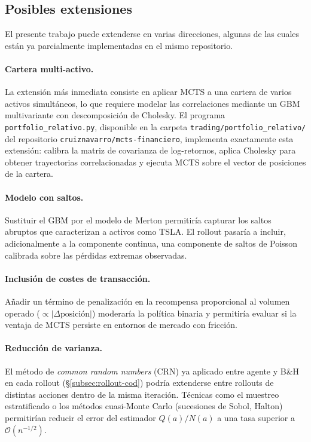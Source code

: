 \subsection{Posibles extensiones}
\label{subsec:extensiones}

El presente trabajo puede extenderse en varias direcciones, algunas de las cuales están ya parcialmente implementadas en el mismo repositorio.

\paragraph{Cartera multi-activo.} La extensión más inmediata consiste en aplicar MCTS a una cartera de varios activos simultáneos, lo que requiere modelar las correlaciones mediante un GBM multivariante con descomposición de Cholesky. El programa \texttt{portfolio\_relativo.py}, disponible en la carpeta \texttt{trading/portfolio\_relativo/} del repositorio \texttt{cruiznavarro/mcts-financiero}, implementa exactamente esta extensión: calibra la matriz de covarianza de log-retornos, aplica Cholesky para obtener trayectorias correlacionadas y ejecuta MCTS sobre el vector de posiciones de la cartera.

\paragraph{Modelo con saltos.} Sustituir el GBM por el modelo de Merton permitiría capturar los saltos abruptos que caracterizan a activos como TSLA. El rollout pasaría a incluir, adicionalmente a la componente continua, una componente de saltos de Poisson calibrada sobre las pérdidas extremas observadas.

\paragraph{Inclusión de costes de transacción.} Añadir un término de penalización en la recompensa proporcional al volumen operado ($\propto |\Delta\text{posición}|$) moderaría la política binaria y permitiría evaluar si la ventaja de MCTS persiste en entornos de mercado con fricción.

\paragraph{Reducción de varianza.} El método de \emph{common random numbers} (CRN) ya aplicado entre agente y B\&H en cada rollout (§\ref{subsec:rollout-cod}) podría extenderse entre rollouts de distintas acciones dentro de la misma iteración. Técnicas como el muestreo estratificado o los métodos cuasi-Monte Carlo (sucesiones de Sobol, Halton) permitirían reducir el error del estimador $Q(a)/N(a)$ a una tasa superior a $\mathcal{O}(n^{-1/2})$.

